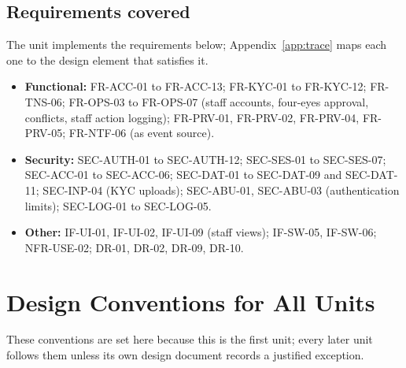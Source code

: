 \documentclass[11pt,a4paper]{article}
\begin{document}
\subsection{Requirements covered}
The unit implements the requirements below; Appendix~\ref{app:trace} maps each one to the design element that satisfies it.
\begin{itemize}[nosep]
  \item \textbf{Functional:} FR-ACC-01 to FR-ACC-13; FR-KYC-01 to FR-KYC-12; FR-TNS-06; FR-OPS-03 to FR-OPS-07 (staff accounts, four-eyes approval, conflicts, staff action logging); FR-PRV-01, FR-PRV-02, FR-PRV-04, FR-PRV-05; FR-NTF-06 (as event source).
  \item \textbf{Security:} SEC-AUTH-01 to SEC-AUTH-12; SEC-SES-01 to SEC-SES-07; SEC-ACC-01 to SEC-ACC-06; SEC-DAT-01 to SEC-DAT-09 and SEC-DAT-11; SEC-INP-04 (KYC uploads); SEC-ABU-01, SEC-ABU-03 (authentication limits); SEC-LOG-01 to SEC-LOG-05.
  \item \textbf{Other:} IF-UI-01, IF-UI-02, IF-UI-09 (staff views); IF-SW-05, IF-SW-06; NFR-USE-02; DR-01, DR-02, DR-09, DR-10.
\end{itemize}

\section{Design Conventions for All Units}
\label{sec:conventions}
These conventions are set here because this is the first unit; every later unit follows them unless its own design document records a justified exception.
\end{document}
